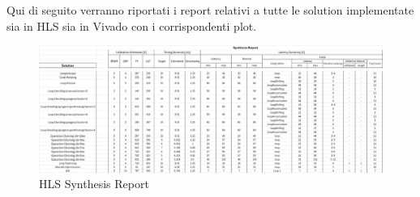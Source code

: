 Qui di seguito verranno riportati i report relativi a tutte le solution implementate sia in HLS sia in Vivado con i corrispondenti plot.

\begin{figure}[H]
    \centering
    \includegraphics[width=0.9\textheight, angle=90]{conclusions/synthesis.jpeg}
    \caption{HLS Synthesis Report}
    \label{fig:hls-synthesis-report}
\end{figure}

